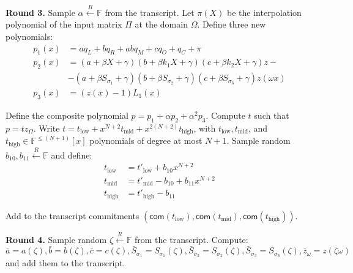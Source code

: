 \documentclass[../lecture-notes.tex]{subfiles}
\begin{document}
\textcolor{green!60!black}{\textbf{Round 3.}} Sample $\alpha \xleftarrow{R}
\mathbb{F}$ from the transcript. Let $\pi(X)$ be the interpolation polynomial of the
input matrix $\Pi$ at the domain $\Omega$. Define three new polynomials:
\begin{align*}
p_1(x) &= aq_L + bq_R + abq_M + cq_O + q_C + \pi \\
p_2(x) &= (a + \beta X + \gamma)(b + \beta k_1 X + \gamma)(c + \beta k_2 X + \gamma)z - \\
    &- (a + \beta S_{\sigma_1} + \gamma)(b + \beta S_{\sigma_2} + \gamma)(c + \beta S_{\sigma_3} + \gamma)z(\omega x) \\
p_3(x) &= (z(x) - 1)L_1(x)
\end{align*}

Define the composite polynomial $p = p_1 + \alpha p_2 + \alpha^2 p_3$. Compute
$t$ such that $p = tz_{\Omega}$. Write $t = t_{\text{low}} +
x^{N+2}t_{\text{mid}} + x^{2(N+2)}t_{\text{high}}$, with $t_{\text{low}},
t_{\text{mid}}$, and $t_{\text{high}} \in \mathbb{F}^{\leq (N+1)}[x]$
polynomials of degree at most $N+1$. Sample random $b_{10}, b_{11}
\xleftarrow{R} \mathbb{F}$ and define:
\begin{align*}
t_{\text{low}} &= t'_{\text{low}} + b_{10}x^{N+2} \\
t_{\text{mid}} &= t'_{\text{mid}} - b_{10} + b_{11}x^{N+2} \\
t_{\text{high}} &= t'_{\text{high}} - b_{11}
\end{align*}

Add to the transcript commitments $(\mathsf{com}(t_{\text{low}}), \mathsf{com}(t_{\text{mid}}), \mathsf{com}(t_{\text{high}}))$.

\textcolor{green!60!black}{\textbf{Round 4.}} Sample random $\zeta \xleftarrow{R}
\mathbb{F}$ from the transcript. Compute:
\[\bar{a} = a(\zeta), \bar{b} = b(\zeta), \bar{c} = c(\zeta), \bar{S}_{\sigma_1} = S_{\sigma_1}(\zeta), \bar{S}_{\sigma_2} = S_{\sigma_2}(\zeta), \bar{S}_{\sigma_3} = S_{\sigma_3}(\zeta), \bar{z}_{\omega} = z(\zeta \omega)\]
and add them to the transcript.
\end{document}
